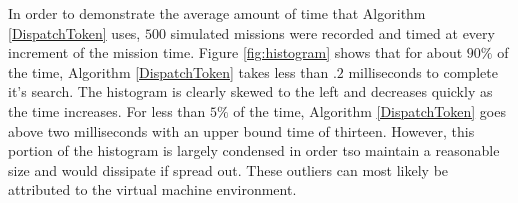 In order to demonstrate the average amount of time that Algorithm
\ref{DispatchToken} uses, $500$ simulated missions were recorded and timed
at every increment of the mission time. Figure \ref{fig:histogram} shows that for about
$90\%$ of the time, Algorithm \ref{DispatchToken} takes less than $.2$
milliseconds to complete it's search. The histogram is clearly skewed
to the left and decreases quickly as the time increases.  For less than $5\%$
of the time, Algorithm \ref{DispatchToken} goes above two
milliseconds with an upper bound time of thirteen. However, this
portion of the histogram is largely condensed in order tso maintain a
reasonable size and would dissipate if spread out. These outliers can 
most likely be attributed to the virtual machine environment.

